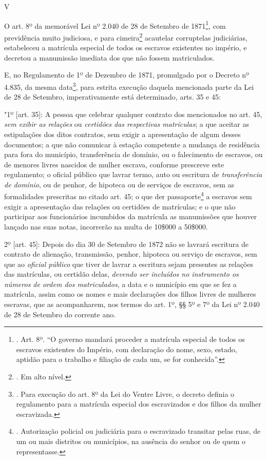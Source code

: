 V

O art. 8º da memorável Lei nº 2.040 de 28 de Setembro de 1871\footnote{.
  Art. 8º. ``O governo mandará proceder a matrícula especial de todos os
  escravos existentes do Império, com declaração do nome, sexo, estado,
  aptidão para o trabalho e filiação de cada um, se for conhecida''.},
com previdência muito judiciosa, e para cimeira\footnote{. Em alto
  nível.} acautelar corruptelas judiciárias, estabeleceu a matrícula
especial de todos os escravos existentes no império, e decretou a
manumissão imediata dos que não fossem matriculados.

E, no Regulamento de 1º de Dezembro de 1871, promulgado por o Decreto nº
4.835, da mesma data\footnote{. Para execução do art. 8º da Lei do
  Ventre Livre, o decreto definia o regulamento para a matrícula
  especial dos escravizados e dos filhos da mulher escravizada.}, para
estrita execução daquela mencionada parte da Lei de 28 de Setembro,
imperativamente está determinado, arts. 35 e 45:

"1º {[}art. 35{]}: A pessoa que celebrar qualquer contrato dos
mencionados no art. 45, \emph{sem exibir as relações} ou \emph{certidões
das respectivas matrículas}; a que aceitar as estipulações dos ditos
contratos, sem exigir a apresentação de algum desses documentos; a que
não comunicar à estação competente a mudança de residência para fora do
município, transferência de domínio, ou o falecimento de escravos, ou de
menores livres nascidos de mulher escrava, conforme prescreve este
regulamento; o oficial público que lavrar termo, auto ou escritura de
\emph{transferência de domínio}, ou de penhor, de hipoteca ou de
serviços de escravos, sem as formalidades prescritas no citado art. 45;
o que der passaporte\footnote{. Autorização policial ou judiciária para
  o escravizado transitar pelas ruas, de um ou mais distritos ou
  municípios, na ausência do senhor ou de quem o representasse.} a
escravos sem exigir a apresentação das relações ou certidões de
matrículas; e o que não participar aos funcionários incumbidos da
matrícula as manumissões que houver lançado nas suas notas, incorrerão
na multa de 10\$000 a 50\$000.

2º {[}art. 45{]}: Depois do dia 30 de Setembro de 1872 não se lavrará
escritura de contrato de alienação, transmissão, penhor, hipoteca ou
serviço de escravos, sem que ao \emph{oficial público} que tiver de
lavrar a escritura sejam presentes as relações das matrículas, ou
certidão delas, \emph{devendo ser incluídos no instrumento os números de
ordem dos matriculados}, a data e o município em que se fez a matrícula,
assim como os nomes e mais declarações dos filhos livres de mulheres
escravas, que as acompanharem, nos termos do art. 1º, §§ 5º e 7º da Lei
nº 2.040 de 28 de Setembro do corrente ano.

